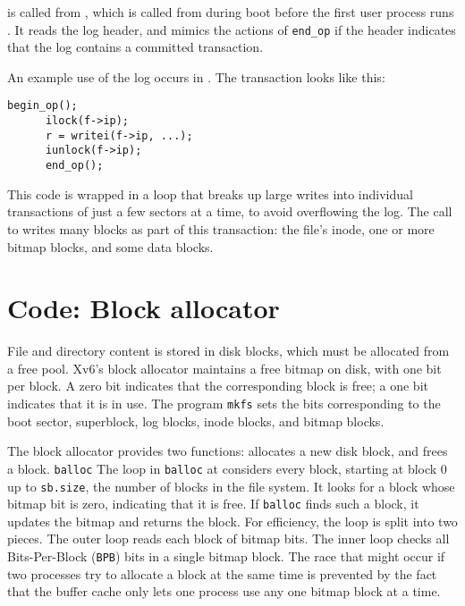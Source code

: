 is called from 
,
which is called from  during boot before the first user process runs
.
It reads the log header, and mimics the actions of
\lstinline{end_op}
if the header indicates that the log contains a committed transaction.

An example use of the log occurs in 
.
The transaction looks like this:
\begin{lstlisting}[]
      begin_op();
      ilock(f->ip);
      r = writei(f->ip, ...);
      iunlock(f->ip);
      end_op();
\end{lstlisting}
This code is wrapped in a loop that breaks up large writes into individual
transactions of just a few sectors at a time, to avoid overflowing
the log.  The call to
writes many blocks as part of this
transaction: the file's inode, one or more bitmap blocks, and some data
blocks.
\section{Code: Block allocator}

File and directory content is stored in disk blocks,
which must be allocated from a free pool.
Xv6's block allocator
maintains a free bitmap on disk, with one bit per block. 
A zero bit indicates that the corresponding block is free;
a one bit indicates that it is in use.
The program
\lstinline{mkfs}
sets the bits corresponding to the boot sector, superblock, log blocks, inode
blocks, and bitmap blocks.

The block allocator provides two functions:
allocates a new disk block, and
frees a block.
\lstinline{balloc}
The loop in
\lstinline{balloc}
at
considers every block, starting at block 0 up to 
\lstinline{sb.size},
the number of blocks in the file system.
It looks for a block whose bitmap bit is zero,
indicating that it is free.
If
\lstinline{balloc}
finds such a block, it updates the bitmap 
and returns the block.
For efficiency, the loop is split into two 
pieces.
The outer loop reads each block of bitmap bits.
The inner loop checks all 
Bits-Per-Block (\lstinline{BPB})
bits in a single bitmap block.
The race that might occur if two processes try to allocate
a block at the same time is prevented by the fact that
the buffer cache only lets one process use any one bitmap block at a time.

